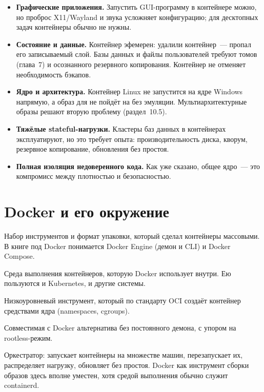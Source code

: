 \begin{itemize}
  \item \textbf{Графические приложения.} Запустить GUI-программу в контейнере
        можно, но проброс X11/Wayland и звука усложняет конфигурацию;
        для десктопных задач контейнеры обычно не нужны.
  \item \textbf{Состояние и данные.} Контейнер эфемерен: удалили контейнер~---
        пропал его записываемый слой. Базы данных и файлы пользователей
        требуют томов (глава~7) и осознанного резервного копирования.
        Контейнер не отменяет необходимость бэкапов.
  \item \textbf{Ядро и архитектура.} Контейнер Linux не запустится на ядре
        Windows напрямую, а образ для  не пойдёт на 
        без эмуляции. Мультиархитектурные образы решают вторую проблему
        (раздел~10.5).
  \item \textbf{Тяжёлые stateful-нагрузки.} Кластеры баз данных в контейнерах
        эксплуатируют, но это требует опыта: производительность диска,
        кворум, резервное копирование, обновления без простоя.
  \item \textbf{Полная изоляция недоверенного кода.} Как уже сказано,
        общее ядро~--- это компромисс между плотностью и безопасностью.
\end{itemize}

\section{Docker и его окружение}

\begin{description}[style=nextline]
  \item[Docker] Набор инструментов и формат упаковки, который сделал
        контейнеры массовыми. В книге под Docker понимается Docker Engine
        (демон и CLI) и Docker Compose.
  \item[containerd] Среда выполнения контейнеров, которую Docker использует
        внутри. Ею пользуются и Kubernetes, и другие системы.
  \item[runc] Низкоуровневый инструмент, который по стандарту OCI создаёт
        контейнер средствами ядра (namespaces, cgroups).
  \item[Podman] Совместимая с Docker альтернатива без постоянного демона,
        с упором на rootless-режим.
  \item[Kubernetes] Оркестратор: запускает контейнеры на множестве машин,
        перезапускает их, распределяет нагрузку, обновляет без простоя.
        Docker как инструмент сборки образов здесь вполне уместен, хотя
        средой выполнения обычно служит containerd.
\end{description}


